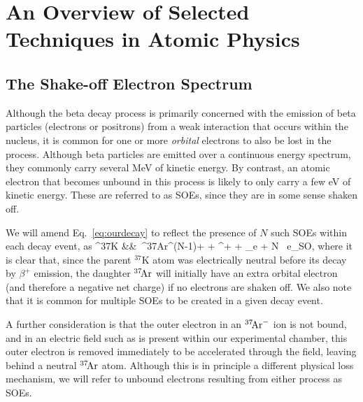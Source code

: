 %
%
%
\clearpage
\chapter{An Overview of Selected Techniques in Atomic Physics}
\label{atomicphysics_chapter}


\section{The Shake-off Electron Spectrum}
\label{section:soe_intro}
Although the beta decay process is primarily concerned with the emission of beta particles (electrons or positrons) from a weak interaction that occurs within the nucleus, it is common for one or more \emph{orbital} electrons to also be lost in the process.  Although beta particles are emitted over a continuous energy spectrum, they commonly carry several MeV of kinetic energy.  By contrast, an atomic electron that becomes unbound in this process is likely to only carry a few eV of kinetic energy.  These are referred to as \acp{SOE}, since they are in some sense shaken off.

We will amend Eq.~\ref{eq:ourdecay} to reflect the presence of $N$ such \ac{SOE}s within each decay event, as
\bea
^{37}\textrm{K} &\rightarrow& \,^{37}\textrm{\!Ar}^{(N-1)+} + \beta^{+} + \nu_e + N \, e_{\textrm{SO}}, 
\label{eq:ourdecay_withsoe}
\eea
where it is clear that, since the parent $^{37}\textrm{K}$ atom was electrically neutral before its decay by $\beta^+$ emission, the daughter $^{37}\textrm{\!Ar}$ will initially have an extra
orbital electron (and therefore a negative net charge) if no electrons are shaken off.  We also note that it is common for multiple SOEs to be created in a given decay event.  

A further consideration is that the outer electron in an $^{37}\textrm{\!Ar}^{-}$ ion is not bound\cite{ArgonMinusIons}, and in an electric field such as is present within our experimental chamber, this outer electron is removed immediately to be accelerated through the field, leaving behind a neutral $^{37}\textrm{\!Ar}$ atom.  Although this is in principle a different physical loss mechanism, we will refer to unbound electrons resulting from either process as SOEs.  

